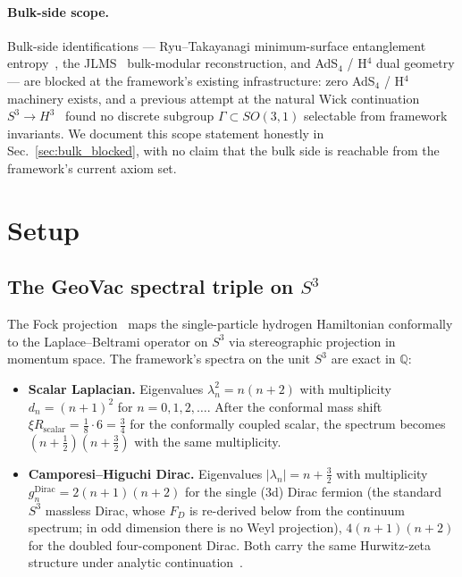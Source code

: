 \documentclass[11pt,a4paper]{article}
\theoremstyle{plain}
\theoremstyle{definition}
\newcommand{\sthree}{S^{3}}
\newcommand{\Q}{\mathbb{Q}}
\begin{document}
\paragraph{Bulk-side scope.}
Bulk-side identifications --- Ryu--Takayanagi minimum-surface
entanglement entropy~\cite{ryu_takayanagi2006}, the
JLMS~\cite{jafferis_lewkowycz_maldacena_suh2016} bulk-modular
reconstruction, and AdS$_{4}$ / H$^{4}$ dual geometry --- are
blocked at the framework's existing infrastructure: zero AdS$_{4}$ /
H$^{4}$ machinery exists, and a previous attempt at the natural Wick
continuation $\sthree \to H^{3}$~\cite{paper29} found no discrete
subgroup $\Gamma \subset SO(3,1)$ selectable from framework
invariants. We document this scope statement honestly in
Sec.~\ref{sec:bulk_blocked}, with no claim that the bulk side is
reachable from the framework's current axiom set.

\section{Setup}
\label{sec:setup}

\subsection{The GeoVac spectral triple on $\sthree$}

The Fock projection~\cite{fock1935, paper7} maps the
single-particle hydrogen Hamiltonian conformally to the
Laplace--Beltrami operator on $\sthree$ via stereographic projection
in momentum space. The framework's spectra on the unit $\sthree$ are
exact in $\Q$:

\begin{itemize}
\item \textbf{Scalar Laplacian.} Eigenvalues $\lambda_{n}^{2} =
n(n+2)$ with multiplicity $d_{n} = (n+1)^{2}$ for $n = 0, 1, 2,
\dots$. After the conformal mass shift $\xi R_{\mathrm{scalar}} =
\tfrac{1}{8} \cdot 6 = \tfrac{3}{4}$ for the conformally coupled
scalar, the spectrum becomes $(n + \tfrac{1}{2})(n + \tfrac{3}{2})$
with the same multiplicity.

\item \textbf{Camporesi--Higuchi Dirac.}
Eigenvalues $|\lambda_{n}| = n + \tfrac{3}{2}$ with multiplicity
$g_{n}^{\mathrm{Dirac}} = 2(n+1)(n+2)$ for the single (3d) Dirac
fermion (the standard $\sthree$ massless Dirac, whose $F_{D}$ is
re-derived below from the continuum spectrum; in odd dimension there is no Weyl projection),
$4(n+1)(n+2)$ for the doubled four-component Dirac. Both carry the
same Hurwitz-zeta structure under
analytic continuation~\cite{paper22, paper23}.
\end{itemize}
\end{document}
